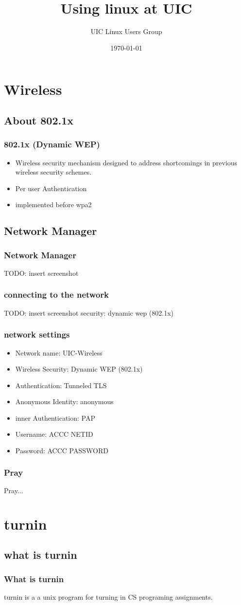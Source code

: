 \documentclass[hyperref={pdfpagelabels=false}]{beamer}
\title{Using linux at UIC}
\author{UIC Linux Users Group}
\date{\today}
\begin{document}
\frame{\titlepage}
\section[outline]{}
\frame[allowframebreaks]{\tableofcontents}
\section{Wireless}
\subsection{About 802.1x}
\frame
{
    \frametitle{802.1x (Dynamic WEP)}
    \begin{itemize}
    \item{Wireless security mechanism designed to address shortcomings in previous wireless security schemes.}
    \item{Per user Authentication}
    \item{implemented before wpa2}
    \end{itemize}
}
\subsection{Network Manager}
\frame
{
    \frametitle{Network Manager}
    TODO: insert screenshot
}
\frame
{
    \frametitle{connecting to the network}
    TODO: insert screenshot
    security: dynamic wep (802.1x)
}
\frame
{
    \frametitle{network settings}
    \begin{itemize}
    \item{Network name: UIC-Wireless}
    \item{Wireless Security: Dynamic WEP (802.1x)}
    \item{Authentication: Tunneled TLS}
    \item{Anonymous Identity: anonymous}
    \item{inner Authentication: PAP}
    \item{Username: ACCC NETID}
    \item{Password: ACCC PASSWORD}
    \end{itemize}
}
\frame
{
    \frametitle{Pray}
    Pray...
}
\section{turnin}
\subsection{what is turnin}
\frame
{
    \frametitle{What is turnin}
    turnin is a a unix program for turning in CS programing assignments.
}
\end{document}
